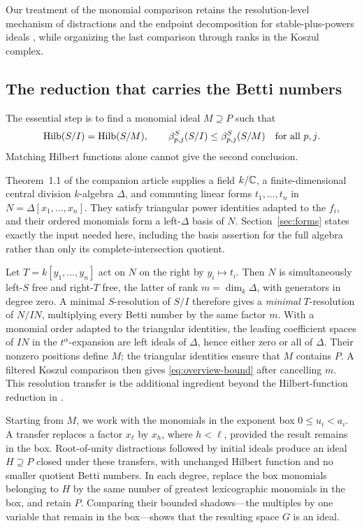 Our treatment of the monomial comparison retains the
resolution-level mechanism of distractions
\cite[Theorem~2.19 and Corollary~2.20]{BCR} and the endpoint
decomposition for stable-plus-powers ideals
\cite[Lemma~3.7]{CS}, while organizing the last comparison through ranks
in the Koszul complex.

\subsection{The reduction that carries the Betti numbers}

The essential step is to find a monomial ideal \(M\supseteq P\) such that
\begin{equation}\label{eq:overview-bound}
 \operatorname{Hilb}(S/I)=\operatorname{Hilb}(S/M),\qquad
 \beta^S_{p,j}(S/I)\le\beta^S_{p,j}(S/M)
 \quad\text{for all \(p,j\)}.
\end{equation}
Matching Hilbert functions alone cannot give the second conclusion.

Theorem~1.1 of the companion article \cite{ArtinianEGH} supplies a field
\(k/\mathbb C\), a finite-dimensional central division \(k\)-algebra \(\Delta\), and commuting linear
forms \(t_1,\ldots,t_n\) in \(N=\Delta[x_1,\ldots,x_n]\). They satisfy
triangular power identities adapted to the \(f_i\), and their ordered
monomials form a left-\(\Delta\) basis of \(N\).
Section~\ref{sec:forms} states exactly the input needed here, including
the basis assertion for the full algebra rather than only its
complete-intersection quotient.

Let \(T=k[y_1,\ldots,y_n]\) act on \(N\) on the right by \(y_i\mapsto t_i\).
Then \(N\) is simultaneously left-\(S\) free and right-\(T\) free, the
latter of rank \(m=\dim_k\Delta\), with generators in degree zero.
A minimal \(S\)-resolution of \(S/I\) therefore gives a
\emph{minimal} \(T\)-resolution of \(N/IN\), multiplying every Betti number
by the same factor \(m\). With a monomial order adapted to the triangular
identities, the leading coefficient spaces of \(IN\) in the
\(t^\alpha\)-expansion are left ideals of \(\Delta\), hence either zero
or all of \(\Delta\). Their nonzero positions define \(M\); the
triangular identities ensure that \(M\) contains \(P\). A filtered
Koszul comparison then gives \eqref{eq:overview-bound} after cancelling
\(m\).
This resolution transfer is the additional ingredient beyond the
Hilbert-function reduction in \cite{ArtinianEGH}.

Starting from \(M\), we work with the monomials in the exponent box
\(0\le u_i<a_i\). A transfer replaces a factor \(x_\ell\) by \(x_h\),
where \(h<\ell\), provided the result remains in the box.
Root-of-unity distractions followed by initial ideals produce an ideal
\(H\supseteq P\) closed under these transfers, with unchanged Hilbert
function and no smaller quotient Betti numbers. In each degree, replace
the box monomials belonging to \(H\) by the same number of greatest
lexicographic monomials in the box, and retain \(P\). Comparing their bounded
shadows---the multiples by one variable that remain in the box---shows
that the resulting space \(G\) is an ideal.

